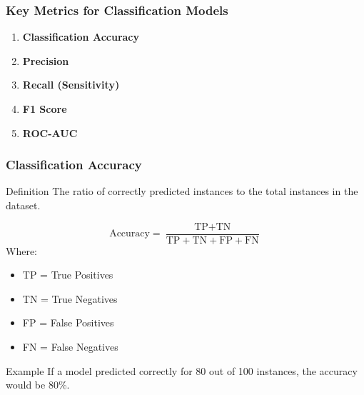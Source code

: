 \documentclass[aspectratio=169]{beamer}
\begin{document}
\begin{frame}[fragile]
    \frametitle{Key Metrics for Classification Models}
    \begin{enumerate}
        \item \textbf{Classification Accuracy}
        \item \textbf{Precision}
        \item \textbf{Recall (Sensitivity)}
        \item \textbf{F1 Score}
        \item \textbf{ROC-AUC}
    \end{enumerate}
\end{frame}

\begin{frame}[fragile]
    \frametitle{Classification Accuracy}
    \begin{block}{Definition}
        The ratio of correctly predicted instances to the total instances in the dataset.
    \end{block}
    \begin{equation}
        \text{Accuracy} = \frac{\text{TP} + \text{TN}}{\text{TP} + \text{TN} + \text{FP} + \text{FN}}
    \end{equation}
    Where:
    \begin{itemize}
        \item TP = True Positives
        \item TN = True Negatives
        \item FP = False Positives
        \item FN = False Negatives
    \end{itemize}
    \begin{block}{Example}
        If a model predicted correctly for 80 out of 100 instances, the accuracy would be 80\%.
    \end{block}
\end{frame}
\end{document}
